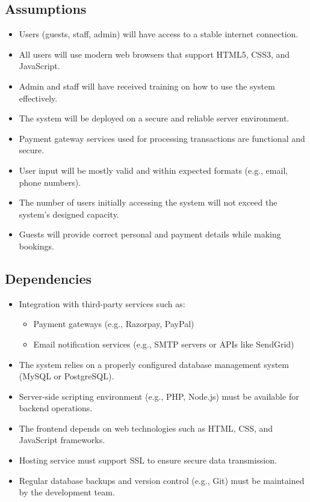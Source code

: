 \documentclass[a4paper,12pt]{article}
\begin{document}
\subsection{Assumptions}
\begin{itemize}
    \item Users (guests, staff, admin) will have access to a stable internet connection.
    \item All users will use modern web browsers that support HTML5, CSS3, and JavaScript.
    \item Admin and staff will have received training on how to use the system effectively.
    \item The system will be deployed on a secure and reliable server environment.
    \item Payment gateway services used for processing transactions are functional and secure.
    \item User input will be mostly valid and within expected formats (e.g., email, phone numbers).
    \item The number of users initially accessing the system will not exceed the system’s designed capacity.
    \item Guests will provide correct personal and payment details while making bookings.
\end{itemize}

\subsection{Dependencies}
\begin{itemize}
    \item Integration with third-party services such as:
    \begin{itemize}
        \item Payment gateways (e.g., Razorpay, PayPal)
        \item Email notification services (e.g., SMTP servers or APIs like SendGrid)
    \end{itemize}
    \item The system relies on a properly configured database management system (MySQL or PostgreSQL).
    \item Server-side scripting environment (e.g., PHP, Node.js) must be available for backend operations.
    \item The frontend depends on web technologies such as HTML, CSS, and JavaScript frameworks.
    \item Hosting service must support SSL to ensure secure data transmission.
    \item Regular database backups and version control (e.g., Git) must be maintained by the development team.
\end{itemize}
\end{document}
